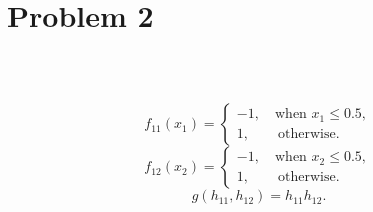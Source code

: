 \section{Problem 2}~\label{sec:prob2}

\subsection{} %

\begin{equation}
    f_{11}(x_1) = \begin{cases}
            -1, \quad \text{when }x_1\le 0.5, \\
            1, \quad\quad \text{otherwise}.
        \end{cases}
\end{equation}
\begin{equation}
    f_{12}(x_2) = \begin{cases}
            -1, \quad \text{when }x_2\le 0.5, \\
            1, \quad\quad \text{otherwise}.
        \end{cases}
\end{equation}
\begin{equation}
    g(h_{11}, h_{12}) = h_{11} h_{12}.
\end{equation}

\subsection{} %

